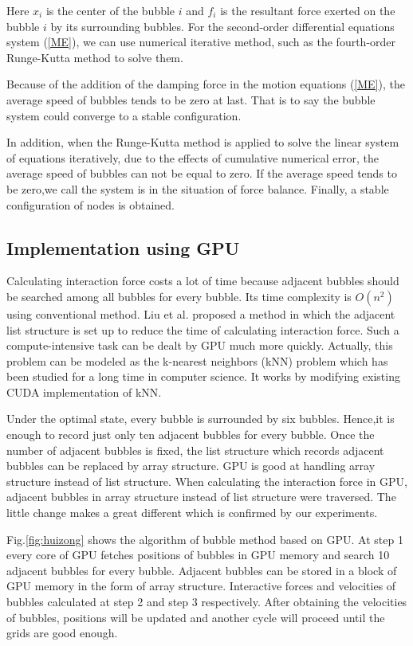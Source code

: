 \documentclass[a4paper, 11pt, final]{article}
\begin{document}
Here $x_i$ is the center of the bubble $i$ and $f_i$ is the resultant force exerted on the bubble 
$i$ by its surrounding bubbles. For the second-order differential equations system (\ref{ME}), we can
use numerical iterative method, such as the fourth-order Runge-Kutta method to solve them.

Because of the addition of the damping force in the motion equations (\ref{ME}), the average speed of
bubbles tends to be zero at last. That is to say the bubble system could converge to a stable
configuration.

In addition, when the Runge-Kutta method is applied to solve the linear system of equations iteratively,
due to the effects of cumulative numerical error, the average speed of bubbles can not be equal to zero.
If the average speed tends to be zero,we call the system is in the situation of force balance. Finally,
a stable configuration of nodes is obtained.

\subsection{Implementation using GPU}
Calculating interaction force costs a lot of time because adjacent bubbles
should be searched among all bubbles for every bubble. 
Its time complexity is \(O(n^2)\) using conventional method. 
Liu et al.\cite{12} proposed a method in which the adjacent list structure
is set up to reduce the time of calculating interaction force.
Such a compute-intensive task can be dealt by GPU much more quickly.
Actually, this problem can be modeled as the k-nearest neighbors (kNN)
problem which has been studied for a long time in computer science. 
It works by modifying existing CUDA implementation of kNN. 

Under the optimal state, every bubble is surrounded by six bubbles.
Hence,it is enough to record just only ten adjacent bubbles 
for every bubble. Once the number of adjacent bubbles is fixed, the list
structure which records adjacent bubbles can be replaced by array structure.
GPU is good at handling array structure instead of list structure.
When calculating the interaction force in GPU, adjacent bubbles
in array structure instead of list structure were traversed. The little change
makes a great different which is confirmed by our experiments. 

Fig.\;\ref{fig:huizong}  shows the algorithm of bubble method based on GPU.
At step 1 every core of GPU fetches positions of bubbles in GPU memory and
search 10 adjacent bubbles for every bubble. Adjacent bubbles can be stored
in a block of GPU memory in the form of array structure. Interactive forces
and velocities of bubbles calculated at step 2 and step 3 respectively. After
obtaining the velocities of bubbles, positions will be updated and another
cycle will proceed until the grids are good enough.
\end{document}
